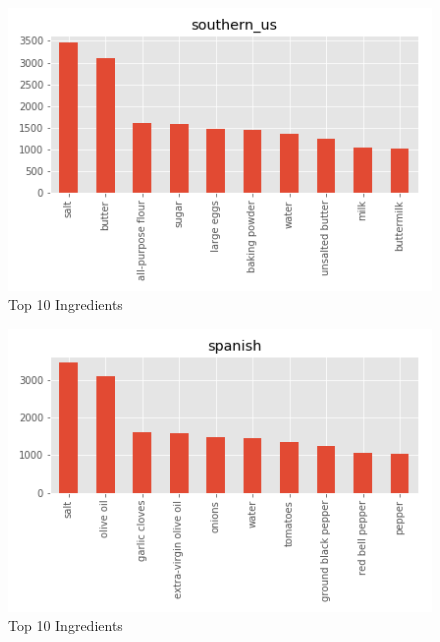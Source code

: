 \documentclass[sigconf]{acmart}
\begin{document}
\begin{figure}[!ht]
  \centering\includegraphics[width=\columnwidth]{images/southern_us_10_most_used_ingredients.png}
  \caption{Top 10 Ingredients }\label{f:southern_us_10_most_used_ingredients}
\end{figure}

\begin{figure}[!ht]
  \centering\includegraphics[width=\columnwidth]{images/spanish_10_most_used_ingredients.png}
  \caption{Top 10 Ingredients }\label{f:spanish_10_most_used_ingredients}
\end{figure}
\end{document}

